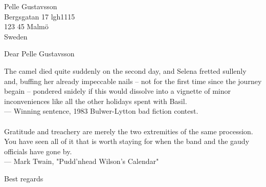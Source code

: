 \documentclass[fontsize=12pt,a4paper]{scrlttr2}
\begin{document}
 
	
\begin{letter}{Pelle Gustavsson \\ Bergsgatan 17 lgh1115 \\ 123 45 Malmö \\ Sweden}
\opening{Dear Pelle Gustavsson}

The camel died quite suddenly on the second day, and Selena fretted
sullenly and, buffing her already impeccable nails -- not for the first
time since the journey begain -- pondered snidely if this would dissolve
into a vignette of minor inconveniences like all the other holidays spent
with Basil.
\\
--- Winning sentence, 1983 Bulwer-Lytton bad fiction contest.
\\\\
Gratitude and treachery are merely the two extremities of the same procession.
You have seen all of it that is worth staying for when the band and the gaudy
officials have gone by.
\\
--- Mark Twain, "Pudd'nhead Wilson's Calendar"


\closing{Best regards}
\end{letter}
\end{document}
